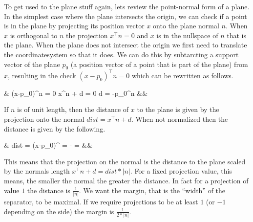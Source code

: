 \documentclass[12pt]{article}
\newcommand{\eqnsnn}[1]{\begin{flalign*} #1 \end{flalign*}}
\newcommand{\T}{^\top}
\newcommand{\equivalent}{\Leftrightarrow}
\begin{document}
To get used to the plane stuff again, lets review the point-normal form of a plane.
In the simplest case where the plane intersects the origin, we can check if a point is in the plane by projecting its position vector $x$ onto the plane normal $n$. When $x$ is orthogonal to $n$ the projection $x\T n = 0$ and $x$ is in the nullspace of $n$ that is the plane.
When the plane does not intersect the origin we first need to translate the coordinatesystem so that it does.
We can do this by subtarcting a support vector of the plane $p_0$ (a position vector of a point that is part of the plane) from $x$, resulting in the check $(x-p_0)\T n = 0$ which can be rewritten as follows.
\eqnsnn{&
(x-p_0)\T n = 0 \equivalent x\T n + d = 0 \quad\text{with constant}\quad d = -p_0\T n
&&}
If $n$ is of unit length, then the distance of $x$ to the plane is given by the projection onto the normal $dist=x\T n + d$.
When not normalized then the distance is given by the following.
\eqnsnn{&
dist = (x-p_0)\T {} = \frac{x\T n}{|n|} - \frac{p_0\T n}{|n|} = \frac{x\T n + d}{|n|}
&&}
This means that the projection on the normal is the distance to the plane scaled by the normals length $x\T n + d = dist*|n|$.
For a fixed projection value, this means, the smaller the normal the greater the distance.
In fact for a projection of value $1$ the distance is $\frac{1}{|n|}$.
We want the margin, that is the \enquote{width} of the separator, to be maximal.
If we require projections to be at least $1$ (or $-1$ depending on the side) the margin is $\frac{1}{2*|n|}$. 
\end{document}
